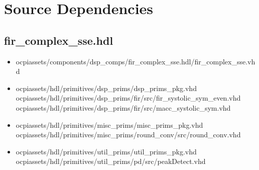 \documentclass{article}
\def\comp{fir\_complex\_sse}
\begin{document}
\section*{Source Dependencies}
\subsection*{\comp.hdl}
\begin{itemize}
	\item ocpiassets/components/dsp\_comps/fir\_complex\_sse.hdl/fir\_complex\_sse.vhd
	\item ocpiassets/hdl/primitives/dsp\_prims/dsp\_prims\_pkg.vhd
	      \subitem ocpiassets/hdl/primitives/dsp\_prims/fir/src/fir\_systolic\_sym\_even.vhd
	      \subitem ocpiassets/hdl/primitives/dsp\_prims/fir/src/macc\_systolic\_sym.vhd
	\item ocpiassets/hdl/primitives/misc\_prims/misc\_prims\_pkg.vhd
	      \subitem ocpiassets/hdl/primitives/misc\_prims/round\_conv/src/round\_conv.vhd
	\item ocpiassets/hdl/primitives/util\_prims/util\_prims\_pkg.vhd
	      \subitem ocpiassets/hdl/primitives/util\_prims/pd/src/peakDetect.vhd
\end{itemize}
\end{document}
